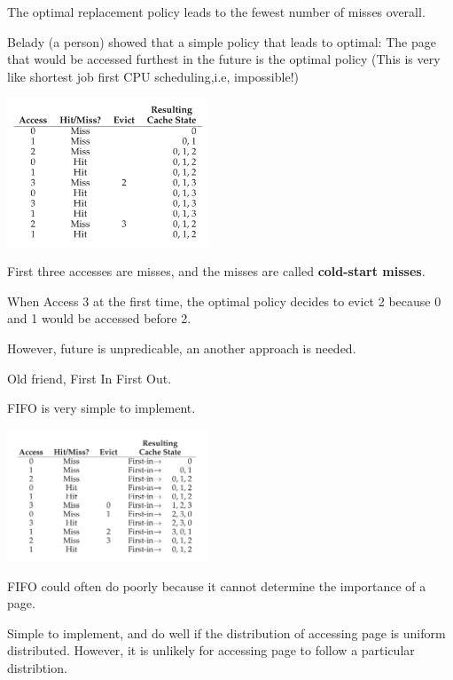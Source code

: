 
    The optimal replacement policy leads to the fewest number of misses overall.

    Belady (a person) showed that a simple policy that leads to optimal:
    The page that would be accessed furthest in the future is the optimal policy
    (This is very like shortest job first CPU scheduling,i.e, impossible!)

    \includegraphics[width=0.45\textwidth]{chapters/chapter1/Segmentation_Paging/OptimalSwappingPolicy.png}

    First three accesses are misses, and the misses are called \textbf{cold-start misses}.

    When Access 3 at the first time, the optimal policy decides to evict 2 because
    0 and 1 would be accessed before 2.

    However, future is  unpredicable, an another approach is needed.


    Old friend, First In First Out.

    FIFO is very simple to implement.

    \includegraphics[width=0.45\textwidth]{chapters/chapter1/Segmentation_Paging/FIFO.png}

    FIFO could often do poorly because it cannot determine the importance of a page.



    Simple to implement, and do well if the distribution of accessing page is uniform
    distributed. However, it is unlikely for accessing page to follow a particular
    distribtion.

